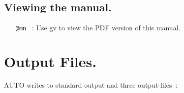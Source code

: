 \documentclass[12pt]{report}
\begin{document}
\section{ Viewing the manual.} 

\begin{itemize}

\item[\tt @mn]~: Use {\cal gv} to view the PDF version of this manual.
\end{itemize}

\newpage

\chapter{ Output Files.} \label{ch:Output_files}
{\cal AUTO} writes to standard output and three output-files~:
\end{document}
